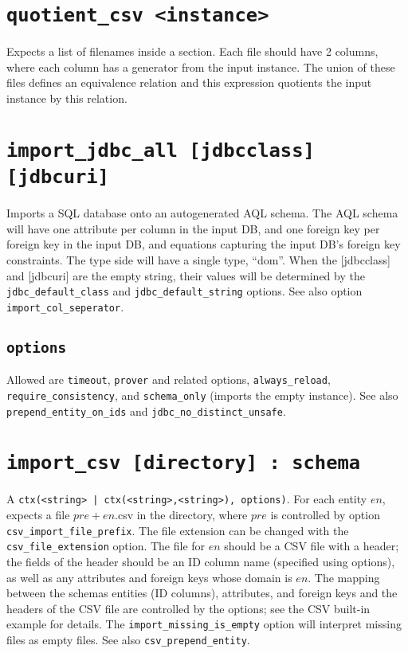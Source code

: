 \documentclass[10pt]{book}
\begin{document}
\section{{\tt quotient\_csv <instance>}}
Expects a list of filenames inside a section.  Each file should have 2 columns, where each column has a generator from the input instance.  The union of these files defines an equivalence relation and this expression quotients the input instance by this relation. 

\section{{\tt import\_jdbc\_all [jdbcclass] [jdbcuri]}}

Imports a SQL database onto an autogenerated AQL schema.  The AQL schema will have one attribute per column in the input DB, and one foreign key per foreign key in the input DB, and equations capturing the input DB's foreign key constraints.  The type side will have a single type, ``dom''.  When the [jdbcclass] and [jdbcuri] are the empty string, their values will be determined by the {\tt jdbc\_default\_class} and {\tt jdbc\_default\_string} options.  See also option {\tt import\_col\_seperator}.

\subsection{{\tt options}}
Allowed are {\tt timeout}, {\tt prover} and related options, {\tt always\_reload}, {\tt require\_consistency}, and {\tt schema\_only} (imports the empty instance).  See also {\tt prepend\_entity\_on\_ids} and  {\tt jdbc\_no\_distinct\_unsafe}.

\section{{\tt import\_csv [directory] : schema}}
A {\tt ctx(<string> | ctx(<string>,<string>), options)}.  For each entity $en$, expects a file $pre + en$.csv in the directory, where $pre$ is controlled by option {\tt csv\_import\_file\_prefix}.  The file extension can be changed with the {\tt csv\_file\_extension} option.  The file for $en$ should be a CSV file with a header; the fields of the header should be an ID column name (specified using options), as well as any attributes and foreign keys whose domain is $en$.  The mapping between the schemas entities (ID columns), attributes, and foreign keys and the headers of the CSV file are controlled by the options; see the CSV built-in example for details.  The {\tt import\_missing\_is\_empty} option will interpret missing files as empty files.  See also {\tt csv\_prepend\_entity}. 
\end{document}

